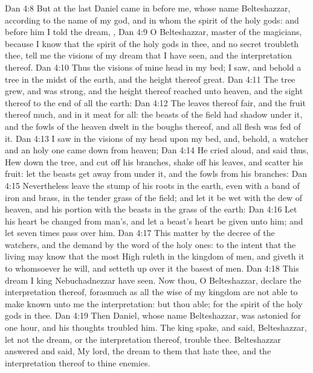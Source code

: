 \vs Dan 4:8 But at the last Daniel came in before me, whose name  Belteshazzar, according to the name of my god, and in whom  the spirit of the holy gods: and before him I told the dream, ,
\vs Dan 4:9 O Belteshazzar, master of the magicians, because I know that the spirit of the holy gods  in thee, and no secret troubleth thee, tell me the visions of my dream that I have seen, and the interpretation thereof.
\vs Dan 4:10 Thus  the visions of mine head in my bed; I saw, and behold a tree in the midst of the earth, and the height thereof  great.
\vs Dan 4:11 The tree grew, and was strong, and the height thereof reached unto heaven, and the sight thereof to the end of all the earth:
\vs Dan 4:12 The leaves thereof  fair, and the fruit thereof much, and in it  meat for all: the beasts of the field had shadow under it, and the fowls of the heaven dwelt in the boughs thereof, and all flesh was fed of it.
\vs Dan 4:13 I saw in the visions of my head upon my bed, and, behold, a watcher and an holy one came down from heaven;
\vs Dan 4:14 He cried aloud, and said thus, Hew down the tree, and cut off his branches, shake off his leaves, and scatter his fruit: let the beasts get away from under it, and the fowls from his branches:
\vs Dan 4:15 Nevertheless leave the stump of his roots in the earth, even with a band of iron and brass, in the tender grass of the field; and let it be wet with the dew of heaven, and  his portion  with the beasts in the grass of the earth:
\vs Dan 4:16 Let his heart be changed from man's, and let a beast's heart be given unto him; and let seven times pass over him.
\vs Dan 4:17 This matter  by the decree of the watchers, and the demand by the word of the holy ones: to the intent that the living may know that the most High ruleth in the kingdom of men, and giveth it to whomsoever he will, and setteth up over it the basest of men.
\vs Dan 4:18 This dream I king Nebuchadnezzar have seen. Now thou, O Belteshazzar, declare the interpretation thereof, forasmuch as all the wise  of my kingdom are not able to make known unto me the interpretation: but thou  able; for the spirit of the holy gods  in thee.
\vs Dan 4:19 Then Daniel, whose name  Belteshazzar, was astonied for one hour, and his thoughts troubled him. The king spake, and said, Belteshazzar, let not the dream, or the interpretation thereof, trouble thee. Belteshazzar answered and said, My lord, the dream  to them that hate thee, and the interpretation thereof to thine enemies.
